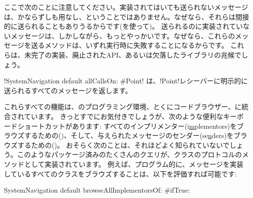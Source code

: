 \documentclass[a4paper,10pt,twoside]{book}
\begin{document}
ここで次のことに注意してください。実装されてはいても送られないメッセージは、かならずしも用なし、ということではありません。なぜなら、それらは間接的に送られることもありうるからです(\eg {}を使って)。
送られるのに実装されていないメッセージは、しかしながら、もっとやっかいです。なぜなら、これらのメッセージを送るメソッドは、いずれ実行時に失敗することになるからです。
これらは、未完了の実装、廃止されたAPI、あるいは欠落したライブラリの兆候でしょう。

\ct!SystemNavigation default allCallsOn: #Point! は、\ct!Point!レシーバーに明示的に送られるすべてのメッセージを返します。

これらすべての機能は、\pharo のプログラミング環境、とくにコードブラウザー、に統合されています。
きっとすでにお気付きでしょうが、次のような便利なキーボードショートカットがあります: すべてのインプリメンター(i\underline{m}plementors)をブラウズするための()、そして、与えられたメッセージのセンダー(se\underline{n}ders)をブラウズするための()。
おそらく次のことは、それほどよく知られていないでしょう。このようなパッケージ済みのたくさんのクエリが、クラスのプロトコルのメソッドとして実装されています。%
例えば、プログラム的に、メッセージを実装しているすべてのクラスをブラウズすることは、以下を評価すれば可能です:
\begin{code}{}
SystemNavigation default browseAllImplementorsOf: #ifTrue:
\end{code}
\end{document}

